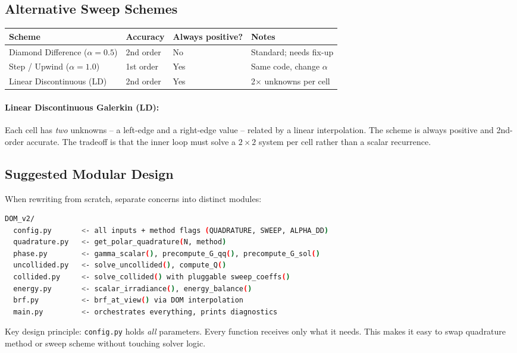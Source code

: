 \documentclass[12pt]{article}
\begin{document}
\subsection{Alternative Sweep Schemes}

\begin{center}
\begin{tabular}{llll}
  \toprule
  Scheme & Accuracy & Always positive? & Notes \\
  \midrule
  Diamond Difference ($\alpha=0.5$) & 2nd order & No & Standard; needs fix-up \\
  Step / Upwind ($\alpha=1.0$) & 1st order & Yes & Same code, change $\alpha$ \\
  Linear Discontinuous (LD) & 2nd order & Yes & 2$\times$ unknowns per cell \\
  \bottomrule
\end{tabular}
\end{center}

\paragraph{Linear Discontinuous Galerkin (LD):} Each cell has \emph{two}
unknowns -- a left-edge and a right-edge value -- related by a linear
interpolation. The scheme is always positive and 2nd-order accurate. The
tradeoff is that the inner loop must solve a $2\times2$ system per cell
rather than a scalar recurrence.

\subsection{Suggested Modular Design}

When rewriting from scratch, separate concerns into distinct modules:

\begin{lstlisting}[language=bash,numbers=none]
DOM_v2/
  config.py       <- all inputs + method flags (QUADRATURE, SWEEP, ALPHA_DD)
  quadrature.py   <- get_polar_quadrature(N, method)
  phase.py        <- gamma_scalar(), precompute_G_qq(), precompute_G_sol()
  uncollided.py   <- solve_uncollided(), compute_Q()
  collided.py     <- solve_collided() with pluggable sweep_coeffs()
  energy.py       <- scalar_irradiance(), energy_balance()
  brf.py          <- brf_at_view() via DOM interpolation
  main.py         <- orchestrates everything, prints diagnostics
\end{lstlisting}

Key design principle: \texttt{config.py} holds \emph{all} parameters. Every
function receives only what it needs. This makes it easy to swap quadrature
method or sweep scheme without touching solver logic.
\end{document}
